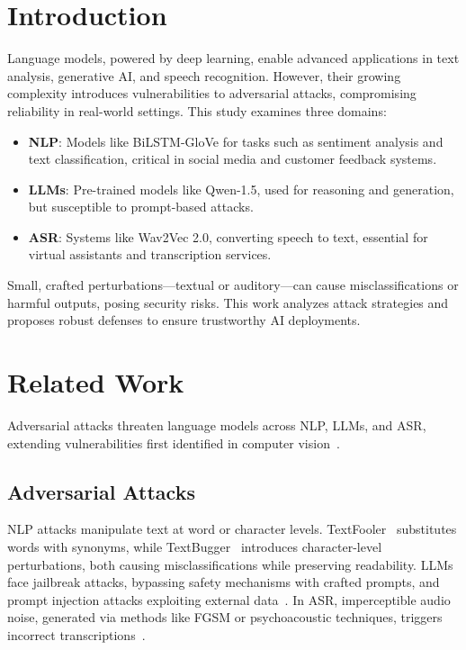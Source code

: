 \documentclass[conference]{IEEEtran}
\begin{document}
\section{Introduction}
Language models, powered by deep learning, enable advanced applications in text analysis, generative AI, and speech recognition. However, their growing complexity introduces vulnerabilities to adversarial attacks, compromising reliability in real-world settings. This study examines three domains:
\begin{itemize}
    \item \textbf{NLP}: Models like BiLSTM-GloVe for tasks such as sentiment analysis and text classification, critical in social media and customer feedback systems.
    \item \textbf{LLMs}: Pre-trained models like Qwen-1.5, used for reasoning and generation, but susceptible to prompt-based attacks.
    \item \textbf{ASR}: Systems like Wav2Vec 2.0, converting speech to text, essential for virtual assistants and transcription services.
\end{itemize}
Small, crafted perturbations—textual or auditory—can cause misclassifications or harmful outputs, posing security risks. This work analyzes attack strategies and proposes robust defenses to ensure trustworthy AI deployments.

\section{Related Work}
Adversarial attacks threaten language models across NLP, LLMs, and ASR, extending vulnerabilities first identified in computer vision~\cite{goodfellow2015explaining, jin2019textfooler}.

\subsection{Adversarial Attacks}
NLP attacks manipulate text at word or character levels. TextFooler~\cite{jin2019textfooler} substitutes words with synonyms, while TextBugger~\cite{li2018textbugger} introduces character-level perturbations, both causing misclassifications while preserving readability. LLMs face jailbreak attacks, bypassing safety mechanisms with crafted prompts, and prompt injection attacks exploiting external data~\cite{zou2023universaltransferableadversarialattacks}. In ASR, imperceptible audio noise, generated via methods like FGSM or psychoacoustic techniques, triggers incorrect transcriptions~\cite{qin2019imperceptible, esmaeilpour2021towards}.
\end{document}
